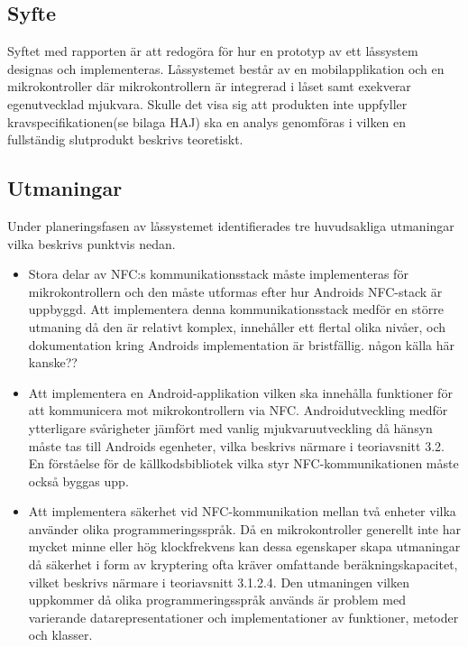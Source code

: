 \documentclass[11pt]{article}
\begin{document}
\subsection{Syfte}
Syftet med rapporten är att redogöra för hur en prototyp av ett låssystem designas och implementeras. Låssystemet består av en mobilapplikation och en mikrokontroller där mikrokontrollern är integrerad i låset samt exekverar egenutvecklad mjukvara. Skulle det visa sig att produkten inte uppfyller kravspecifikationen(se bilaga HAJ) ska en analys genomföras i vilken en fullständig slutprodukt beskrivs teoretiskt.

\subsection{Utmaningar}
Under planeringsfasen av låssystemet identifierades tre huvudsakliga utmaningar vilka beskrivs punktvis nedan.

\begin{itemize}

\item Stora delar av NFC:s kommunikationsstack måste implementeras för mikrokontrollern och den måste utformas efter hur Androids NFC-stack är uppbyggd. Att implementera denna kommunikationsstack medför en större utmaning då den är relativt komplex, innehåller ett flertal olika nivåer, och dokumentation kring Androids implementation är bristfällig. någon källa här kanske??

\item Att implementera en Android-applikation vilken ska innehålla funktioner för att kommunicera mot mikrokontrollern via NFC. Androidutveckling medför ytterligare svårigheter jämfört med vanlig mjukvaruutveckling då hänsyn måste tas till Androids egenheter, vilka beskrivs närmare i teoriavsnitt 3.2. En förståelse för de källkodsbibliotek vilka styr NFC-kommunikationen måste också byggas upp. 

\item Att implementera säkerhet vid NFC-kommunikation mellan två enheter vilka använder olika programmeringsspråk. Då en mikrokontroller generellt inte har mycket minne eller hög klockfrekvens kan dessa egenskaper skapa utmaningar då säkerhet i form av kryptering ofta kräver omfattande beräkningskapacitet, vilket beskrivs närmare i teoriavsnitt 3.1.2.4. Den utmaningen vilken uppkommer då olika programmeringsspråk används är problem med varierande datarepresentationer och implementationer av funktioner, metoder och klasser.

\end{itemize}
\end{document}
